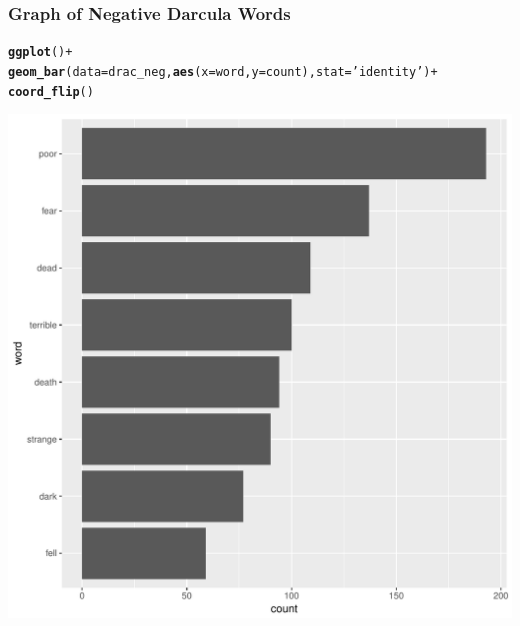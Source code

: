 \documentclass{beamer}\usepackage[]{graphicx}\usepackage[]{color}
\makeatletter
\def\maxwidth{ %
  \ifdim\Gin@nat@width>\linewidth
    \linewidth
  \else
    \Gin@nat@width
  \fi
}
\newcommand{\hlstr}[1]{\textcolor[rgb]{0.192,0.494,0.8}{#1}}%
\newcommand{\hlopt}[1]{\textcolor[rgb]{0,0,0}{#1}}%
\newcommand{\hlstd}[1]{\textcolor[rgb]{0.345,0.345,0.345}{#1}}%
\newcommand{\hlkwc}[1]{\textcolor[rgb]{0.333,0.667,0.333}{#1}}%
\newcommand{\hlkwd}[1]{\textcolor[rgb]{0.737,0.353,0.396}{\textbf{#1}}}%
\newenvironment{kframe}{%
 \def\at@end@of@kframe{}%
 \ifinner\ifhmode%
  \def\at@end@of@kframe{\end{minipage}}%
  \begin{minipage}{\columnwidth}%
 \fi\fi%
 \def\FrameCommand##1{\hskip\@totalleftmargin \hskip-\fboxsep
 \colorbox{shadecolor}{##1}\hskip-\fboxsep
     \hskip-\linewidth \hskip-\@totalleftmargin \hskip\columnwidth}%
 \MakeFramed {\advance\hsize-\width
   \@totalleftmargin\z@ \linewidth\hsize
   \@setminipage}}%
 {\par\unskip\endMakeFramed%
 \at@end@of@kframe}
\newenvironment{knitrout}{}{} %
\makeatother
\begin{document}
\begin{frame}[fragile]

  \frametitle{Graph of Negative Darcula Words}
\begin{knitrout}
\color{fgcolor}\begin{kframe}
\begin{alltt}
\hlkwd{ggplot}\hlstd{()}\hlopt{+}
  \hlkwd{geom_bar}\hlstd{(}\hlkwc{data} \hlstd{= drac_neg,}\hlkwd{aes}\hlstd{(}\hlkwc{x}\hlstd{=word,}\hlkwc{y}\hlstd{=count),}\hlkwc{stat}\hlstd{=}\hlstr{'identity'}\hlstd{)}\hlopt{+}
  \hlkwd{coord_flip}\hlstd{()}
\end{alltt}
\end{kframe}
\includegraphics[width=\maxwidth]{figure/unnamed-chunk-14-1} 

\end{knitrout}
  
\end{frame}
\end{document}
